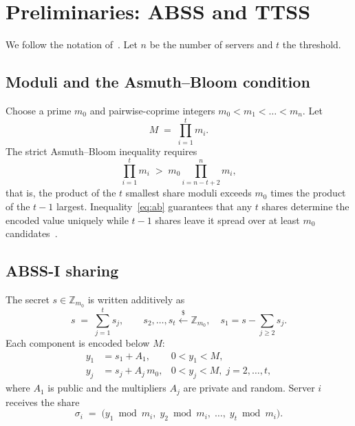 \documentclass[conference]{IEEEtran}
\newcommand{\Z}{\mathbb{Z}}
\begin{document}
\section{Preliminaries: ABSS and TTSS}
\label{sec:prelim}

We follow the notation of~\cite{leslie2025traceable}. Let $n$ be the number of servers and $t$ the threshold.

\subsection{Moduli and the Asmuth--Bloom condition}
Choose a prime $m_0$ and pairwise-coprime integers $m_0 < m_1 < \dots < m_n$. Let
\begin{equation}
  M \;=\; \prod_{i=1}^{t} m_i .
  \label{eq:M}
\end{equation}
The strict Asmuth--Bloom inequality requires
\begin{equation}
  \prod_{i=1}^{t} m_i \;>\; m_0 \prod_{i=n-t+2}^{n} m_i ,
  \label{eq:ab}
\end{equation}
that is, the product of the $t$ smallest share moduli exceeds $m_0$ times the product of the $t-1$ largest. Inequality~\eqref{eq:ab} guarantees that any $t$ shares determine the encoded value uniquely while $t-1$ shares leave it spread over at least $m_0$ candidates~\cite{asmuth1983modular,quisquater2002crt}.

\subsection{ABSS-I sharing}
The secret $s \in \Z_{m_0}$ is written additively as
\begin{equation}
  s \;=\; \sum_{j=1}^{t} s_j , \qquad s_2,\dots,s_t \xleftarrow{\$} \Z_{m_0},\quad s_1 = s-\textstyle\sum_{j\ge 2} s_j .
  \label{eq:additive}
\end{equation}
Each component is encoded below $M$:
\begin{align}
  y_1 &= s_1 + A_1, & 0 < y_1 < M, \label{eq:y1}\\
  y_j &= s_j + A_j\, m_0, & 0 < y_j < M,\; j=2,\dots,t, \label{eq:yj}
\end{align}
where $A_1$ is public and the multipliers $A_j$ are private and random. Server $i$ receives the share
\begin{equation}
  \sigma_i \;=\; \bigl(y_1 \bmod m_i,\; y_2 \bmod m_i,\; \dots,\; y_t \bmod m_i\bigr).
  \label{eq:share}
\end{equation}
\end{document}
